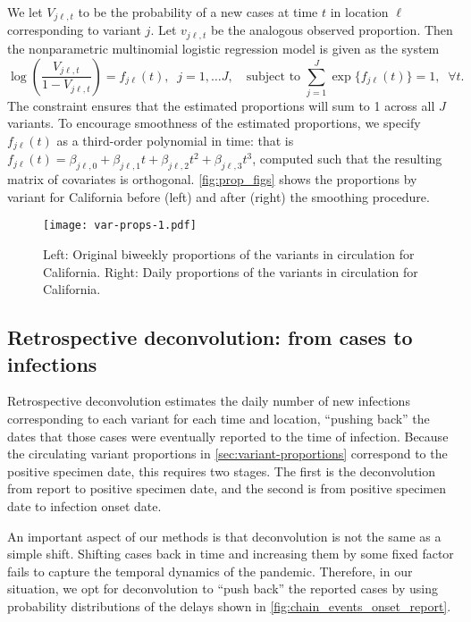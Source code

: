 We let $V_{j\ell,t}$ to be the probability of a new cases at time $t$ in location
$\ell$ corresponding to variant $j$. Let $v_{j\ell,t}$ be the analogous observed
proportion. Then the nonparametric multinomial logistic regression model is given
as the system
\begin{equation}
\log\left(\frac{V_{j\ell,t}}{1-V_{j\ell,t}}\right) = f_{j\ell}(t),\;\; j=1,\ldots J,\quad
\textrm{subject to }\sum_{j=1}^J \exp\{f_{j\ell}(t)\} = 1, \;\;\forall t.
\end{equation}
The constraint ensures that the estimated proportions will sum to 1 across all
$J$ variants. To encourage smoothness of the estimated proportions, we specify
$f_{j\ell}(t)$ as a third-order polynomial in time: that is $f_{j\ell}(t) =
\beta_{j\ell,0} + \beta_{j\ell,1} t + \beta_{j\ell,2}t^2 + \beta_{j\ell,3}t^3$,
computed such that the resulting matrix of covariates is orthogonal.
 \autoref{fig:prop_figs} shows the proportions by variant for California before
(left) and after (right) the smoothing procedure. 

\begin{figure}[!tb]
\centering
    \texttt{[image: var-props-1.pdf]}
    \caption{Left: Original biweekly proportions of the variants in circulation
    for California. Right: Daily proportions of the variants in circulation for
    California.}
    \label{fig:prop_figs}
\end{figure}

\subsection{Retrospective deconvolution: from cases to infections}
\label{sec:deconvolution}

Retrospective deconvolution estimates the daily number of new infections
corresponding to each variant for each time and location, ``pushing back'' the
dates that those cases were eventually reported to the time of infection.
Because the circulating variant proportions in \autoref{sec:variant-proportions}
correspond to the positive specimen date, this requires two stages. The first is
the deconvolution from report to positive specimen date, and the second is from
positive specimen date to infection onset date.

An important aspect of our methods is that deconvolution is not the same as a
simple shift. Shifting cases back in time and increasing them by some fixed
factor fails to capture the temporal dynamics of the pandemic. 
Therefore, in our situation, we opt for deconvolution 
to ``push back'' the reported cases by using probability distributions 
of the delays shown in \autoref{fig:chain_events_onset_report}.

